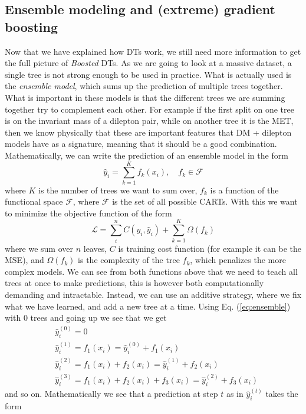 \documentclass[12pt, a4paper]{book}
\begin{document}
\subsection{Ensemble modeling and (extreme) gradient boosting}
Now that we have explained how DTs work, we still need more information to get the full picture of \textit{Boosted} DTs. As we are going to look at a massive dataset, a single tree is not strong enough to be used in practice. What is actually used is the \textit{ensemble model}, which 
sums up the prediction of multiple trees together. What is important in these models is that the different trees we are summing together try to complement each other. For example if the first split on one tree is on the invariant mass of a dilepton pair, while on another tree it is the MET, 
then we know physically that these are important features that DM + dilepton models have as a signature, meaning that it should be a good combination. Mathematically, we can write the prediction of an ensemble model in the form
\begin{equation}\label{eq:ensemble}
    \hat{y}_i =\sum_{k=1}^{K}f_k(x_i),\quad f_k\in\mathcal{F}
\end{equation}
where $K$ is the number of trees we want to sum over, $f_k$ is a function of the functional space $\mathcal{F}$, where $\mathcal{F}$ is the set of all possible CARTs. With this we want to minimize the objective function of the form
$$
    \mathcal{L} = \sum_{i}^{n}C(y_i,\hat{y}_i)+\sum_{k=1}^{K}\Omega(f_k)
$$
where we sum over $n$ leaves, $C$ is training cost function (for example it can be the MSE), and $\Omega(f_k)$ is the complexity of the tree $f_k$, which penalizes the more complex models. We can see from both functions above that we need to teach all trees at once to make predictions, this is however both 
computationally demanding and intractable. Instead, we can use an additive strategy, where we fix what we have learned, and add a new tree at a time. Using Eq. (\ref{eq:ensemble}) with 0 trees and going up we see that we get
\begin{align*}
    &\hat{y}_i^{(0)} = 0\\
    &\hat{y}_i^{(1)} = f_1(x_i)=\hat{y}_i^{(0)}+f_1(x_i)\\
    &\hat{y}_i^{(2)} = f_1(x_i)+f_2(x_i)=\hat{y}_i^{(1)}+f_2(x_i)\\
    &\hat{y}_i^{(3)} = f_1(x_i)+f_2(x_i)+f_3(x_i)=\hat{y}_i^{(2)}+f_3(x_i)
\end{align*}
and so on. Mathematically we see that a prediction at step $t$ as in $\hat{y}_i^{(t)}$ takes the form
\end{document}
